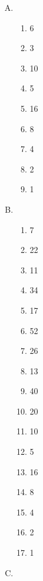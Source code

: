 {{        %
        \begin{practices}
            \begin{enumerate}[A.]
                \item
                {
                    \begin{enumerate}[1.]
                        \item 6
                        \item 3
                        \item 10
                        \item 5
                        \item 16
                        \item 8
                        \item 4
                        \item 2
                        \item 1
                    \end{enumerate}
                }
                \item
                {
                    \begin{enumerate}[1.]
                        \item 7
                        \item 22
                        \item 11
                        \item 34
                        \item 17
                        \item 52
                        \item 26
                        \item 13
                        \item 40
                        \item 20
                        \item 10
                        \item 5
                        \item 16
                        \item 8
                        \item 4
                        \item 2
                        \item 1
                    \end{enumerate}
                }
                \item

\end{enumerate}
\end{practices}}}
